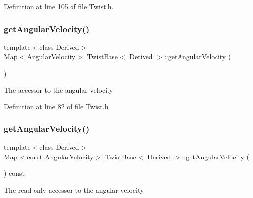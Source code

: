 Definition at line 105 of file Twist.\+h.

\hypertarget{class_twist_base_a9574d52bbded5a52ee8ae7d69f462c1b}{}\label{class_twist_base_a9574d52bbded5a52ee8ae7d69f462c1b} 
\subsubsection{\texorpdfstring{get\+Angular\+Velocity()}{getAngularVelocity()}\hspace{0.1cm}{\footnotesize\ttfamily [1/2]}}
{\footnotesize\ttfamily template$<$class Derived$>$ \\
Map$<$\hyperlink{class_twist_base_ad0bc13debe8afc170da877cebe4dc45f}{Angular\+Velocity}$>$ \hyperlink{class_twist_base}{Twist\+Base}$<$ Derived $>$\+::get\+Angular\+Velocity (\begin{DoxyParamCaption}{ }\end{DoxyParamCaption})\hspace{0.3cm}{\ttfamily [inline]}}

The accessor to the angular velocity 

Definition at line 82 of file Twist.\+h.

\hypertarget{class_twist_base_ab6e1055a88a9d729290272d62b7bb128}{}\label{class_twist_base_ab6e1055a88a9d729290272d62b7bb128} 
\subsubsection{\texorpdfstring{get\+Angular\+Velocity()}{getAngularVelocity()}\hspace{0.1cm}{\footnotesize\ttfamily [2/2]}}
{\footnotesize\ttfamily template$<$class Derived$>$ \\
Map$<$const \hyperlink{class_twist_base_ad0bc13debe8afc170da877cebe4dc45f}{Angular\+Velocity}$>$ \hyperlink{class_twist_base}{Twist\+Base}$<$ Derived $>$\+::get\+Angular\+Velocity (\begin{DoxyParamCaption}{ }\end{DoxyParamCaption}) const\hspace{0.3cm}{\ttfamily [inline]}}

The read-\/only accessor to the angular velocity 

